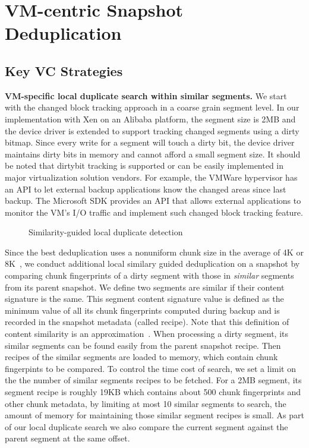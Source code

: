 \section{VM-centric Snapshot Deduplication}
\label{sect:deduplication}

\subsection{Key VC  Strategies}
\label{sect:vc-strategies}
\textbf{VM-specific local duplicate search within similar segments.}
We start with the changed block tracking approach in a coarse grain segment level.
In our implementation with Xen on an Alibaba platform, the segment size is 2MB
and the device driver is extended to support tracking changed segments using a dirty bitmap. 
Since every write for a segment will touch a dirty bit, the device driver maintains dirty bits in memory
and cannot afford a small segment size.
It should be noted that dirtybit tracking is supported or can be easily implemented in 
major virtualization solution vendors. For example,
the VMWare hypervisor has an API to let external backup applications know 
the changed areas since last backup. 
The Microsoft SDK provides an API that allows external applications to monitor 
the VM's I/O traffic and implement such changed block tracking feature.

\begin{figure}[htbp]
  \centering
  \caption{Similarity-guided local duplicate detection}
  \label{fig:local_dedup}
\end{figure}

Since the best deduplication uses a nonuniform chunk size 
in the average of 4K or 8K~\cite{Jin2009},
we conduct additional local similary guided deduplication on a snapshot by comparing
chunk fingerprints of a dirty segment 
with those in  {\em similar} segments from its parent snapshot. 
We define two segments are similar if their content signature is the same.
This segment content signature value is defined as the minimum value of all its chunk fingerprints 
computed during backup and is recorded in the snapshot metadata (called recipe). Note that this definition of
content similarity is an approximation~\cite{resemblance97}.  When processing a dirty segment,
its  similar segments can be found easily from the
parent snapshot recipe.  Then recipes of the similar segments are loaded to memory,
which contain chunk fingerpints to be compared.
To control the time cost of search, we set a limit on the the number of  similar segments recipes to be fetched. 
For a 2MB segment, its segment recipe is roughly 19KB which contains about 500 chunk fingerprints and other chunk metadata,
by limiting at most 10 similar segments to search, the amount of memory for maintaining those similar segment recipes is small.
As part of our local duplicate search we also compare the current segment
against the parent segment at the same offset.

